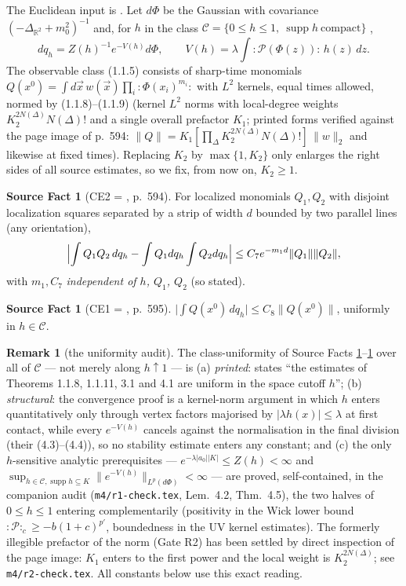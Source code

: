 \documentclass[11pt,a4paper]{article}
\theoremstyle{plain}
\theoremstyle{definition}
\newtheorem{remark}[theorem]{Remark}
\newtheorem{srcfact}[theorem]{Source Fact}
\newcommand{\R}{\mathbb{R}}
\DeclareMathOperator{\supp}{supp}
\begin{document}
The Euclidean input is \cite{GJS}. Let $d\Phi$ be the Gaussian with covariance
$(-\Delta_{\R^2}+m_0^2)^{-1}$ and, for $h$ in the class
$\mathcal C=\{0\le h\le1,\ \supp h\ \text{compact}\}$ \cite[p.~589]{GJS},
\[
  dq_h=Z(h)^{-1}e^{-V(h)}d\Phi,\qquad V(h)=\lambda\int{:}\mathscr P(\Phi(z)){:}\,h(z)\,dz .
\]
The observable class (1.1.5) consists of sharp-time monomials
$Q(x^0)=\int d\vec x\,w(\vec x)\prod_i{:}\Phi(x_i)^{m_i}{:}$ with $L^2$ kernels, equal times
allowed, normed by (1.1.8)--(1.1.9) (kernel $L^2$ norms with local-degree weights
$K_2^{2N(\Delta)}N(\Delta)!$ and a single overall prefactor $K_1$; printed forms
verified against the page image of p.~594:
$\|Q\|=K_1[\prod_\Delta K_2^{2N(\Delta)}N(\Delta)!]\,\|w\|_2$ and likewise at fixed times).
Replacing $K_2$ by $\max\{1,K_2\}$ only enlarges the right sides of all source estimates, so
we fix, from now on, $K_2\ge1$.

\begin{srcfact}[CE2 = {\cite[Thm.~1.1.7]{GJS}}, p.~594]\label{sf:CE2}
For localized monomials $Q_1,Q_2$ with disjoint localization squares separated by a strip of
width $d$ bounded by two parallel lines (any orientation),
\[
  \Bigl|\int Q_1Q_2\,dq_h-\int Q_1dq_h\int Q_2dq_h\Bigr|\le C_7e^{-m_1d}\|Q_1\|\|Q_2\| ,
\]
with $m_1,C_7$ \emph{independent of $h$, $Q_1$, $Q_2$} (so stated).
\end{srcfact}

\begin{srcfact}[CE1 = {\cite[Thm.~1.1.8]{GJS}}, p.~595]\label{sf:CE1}
$\bigl|\int Q(x^0)\,dq_h\bigr|\le C_8\|Q(x^0)\|$, uniformly in $h\in\mathcal C$.
\end{srcfact}

\begin{remark}[the uniformity audit]\label{rem:audit}
The class-uniformity of Source Facts \ref{sf:CE2}--\ref{sf:CE1} over all of $\mathcal C$ ---
not merely along $h\uparrow1$ --- is (a) \emph{printed}: \cite[p.~629]{GJS} states ``the
estimates of Theorems 1.1.8, 1.1.11, 3.1 and 4.1 are uniform in the space cutoff $h$'';
(b) \emph{structural}: the convergence proof is a kernel-norm argument in which $h$ enters
quantitatively only through vertex factors majorised by $|\lambda h(x)|\le\lambda$ at first
contact, while every $e^{-V(h)}$ cancels against the normalisation in the final division
(their (4.3)--(4.4)), so no stability estimate enters any constant; and (c) the only
$h$-sensitive analytic prerequisites --- $e^{-\lambda|a_0||K|}\le Z(h)<\infty$ and
$\sup_{h\in\mathcal C,\supp h\subseteq K}\|e^{-V(h)}\|_{L^p(d\Phi)}<\infty$ --- are proved,
self-contained, in the companion audit (\texttt{m4/r1-check.tex}, Lem.~4.2, Thm.~4.5), the two
halves of $0\le h\le1$ entering complementarily (positivity in the Wick lower bound
${:}\mathscr P{:}_c\ge-b(1+c)^{p'}$, boundedness in the UV kernel estimates). The formerly
illegible prefactor of the norm (Gate R2) has been settled by direct inspection of the page
image: $K_1$ enters to the first power and the local weight is $K_2^{2N(\Delta)}$; see
\texttt{m4/r2-check.tex}. All constants below use this exact reading.
\end{remark}
\end{document}
